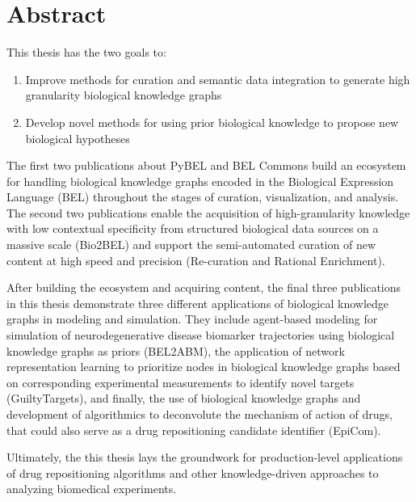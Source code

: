 \chapter*{Abstract}

This thesis has the two goals to:

\begin{enumerate}
    \item Improve methods for curation and semantic data integration to generate high granularity biological knowledge graphs
    \item Develop novel methods for using prior biological knowledge to propose new biological hypotheses
\end{enumerate}


The first two publications about PyBEL and BEL Commons build an ecosystem for handling biological knowledge graphs encoded in the Biological Expression Language (BEL) throughout the stages of curation, visualization, and analysis.
The second two publications enable the acquisition of high-granularity knowledge with low contextual specificity from structured biological data sources on a massive scale (Bio2BEL) and support the semi-automated curation of new content at high speed and precision (Re-curation and Rational Enrichment).

After building the ecosystem and acquiring content, the final three publications in this thesis demonstrate three different applications of biological knowledge graphs in modeling and simulation.
They include agent-based modeling for simulation of neurodegenerative disease biomarker trajectories using biological knowledge graphs as priors (BEL2ABM), the application of network representation learning to prioritize nodes in biological knowledge graphs based on corresponding experimental measurements to identify novel targets (GuiltyTargets), and finally, the use of biological knowledge graphs and development of algorithmics to deconvolute the mechanism of action of drugs, that could also serve as a drug repositioning candidate identifier (EpiCom).

Ultimately, the this thesis lays the groundwork for production-level applications of drug repositioning algorithms and other knowledge-driven approaches to analyzing biomedical experiments.
